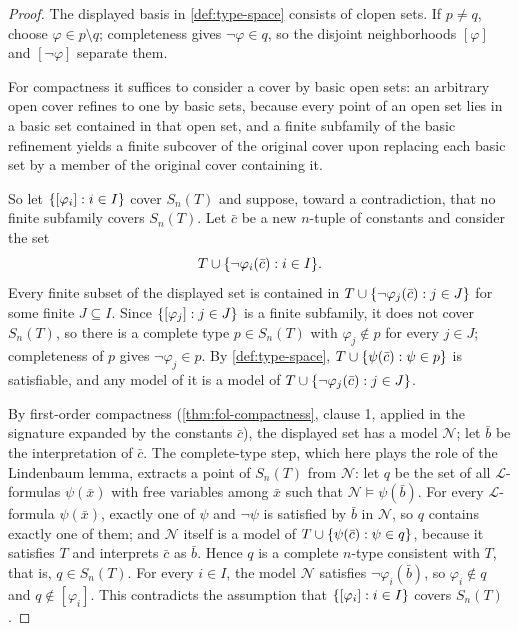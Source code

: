 \documentclass[11pt,oneside,openany]{book}
\theoremstyle{definition}
\theoremstyle{plain}
\theoremstyle{remark}
\DeclarePairedDelimiter{\set}{\lbrace}{\rbrace}
\newcommand{\Lang}{\mathcal{L}}
\newcommand{\entails}{\models}
\begin{document}
\begin{proof}
The displayed basis in \cref{def:type-space} consists of clopen sets.  If
\(p\ne q\), choose \(\varphi\in p\setminus q\); completeness gives
\(\neg\varphi\in q\), so the disjoint neighborhoods \([\varphi]\) and
\([\neg\varphi]\) separate them.

For compactness it suffices to consider a cover by basic open sets: an
arbitrary open cover refines to one by basic sets, because every point of an
open set lies in a basic set contained in that open set, and a finite
subfamily of the basic refinement yields a finite subcover of the original
cover upon replacing each basic set by a member of the original cover
containing it.

So let \(\set{[\varphi_i]:i\in I}\) cover \(S_n(T)\) and suppose, toward a
contradiction, that no finite subfamily covers \(S_n(T)\).  Let \(\bar c\)
be a new \(n\)-tuple of constants and consider the set
\[
  T\cup\set{\neg\varphi_i(\bar c):i\in I}.
\]
Every finite subset of the displayed set is contained in
\(T\cup\set{\neg\varphi_j(\bar c):j\in J}\) for some finite \(J\subseteq I\).
Since \(\set{[\varphi_j]:j\in J}\) is a finite subfamily, it does not cover
\(S_n(T)\), so there is a complete type \(p\in S_n(T)\) with
\(\varphi_j\notin p\) for every \(j\in J\); completeness of \(p\) gives
\(\neg\varphi_j\in p\).  By \cref{def:type-space},
\(T\cup\set{\psi(\bar c):\psi\in p}\) is satisfiable, and any model of it is
a model of \(T\cup\set{\neg\varphi_j(\bar c):j\in J}\).

By first-order compactness (\cref{thm:fol-compactness}, clause 1, applied in
the signature expanded by the constants \(\bar c\)), the displayed set has a
model \(\mathcal N\); let \(\bar b\) be the interpretation of \(\bar c\).
The complete-type step, which here plays the role of the Lindenbaum lemma,
extracts a point of \(S_n(T)\) from \(\mathcal N\): let \(q\) be the set of
all \(\Lang\)-formulas \(\psi(\bar x)\) with free variables among \(\bar x\)
such that \(\mathcal N\entails\psi(\bar b)\).  For every \(\Lang\)-formula
\(\psi(\bar x)\), exactly one of \(\psi\) and \(\neg\psi\) is satisfied by
\(\bar b\) in \(\mathcal N\), so \(q\) contains exactly one of them; and
\(\mathcal N\) itself is a model of \(T\cup\set{\psi(\bar c):\psi\in q}\),
because it satisfies \(T\) and interprets \(\bar c\) as \(\bar b\).  Hence
\(q\) is a complete \(n\)-type consistent with \(T\), that is,
\(q\in S_n(T)\).  For every \(i\in I\), the model \(\mathcal N\) satisfies
\(\neg\varphi_i(\bar b)\), so \(\varphi_i\notin q\) and
\(q\notin[\varphi_i]\).  This contradicts the assumption that
\(\set{[\varphi_i]:i\in I}\) covers \(S_n(T)\).
\end{proof}
\end{document}
